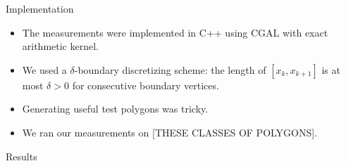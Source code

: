 \documentclass[draft]{beamer}
\begin{document}
\begin{frame}[t]{Implementation}
  \begin{itemize}
    \item The measurements were implemented in C++ using CGAL with exact
      arithmetic kernel.
    \item We used a $\delta$-boundary discretizing scheme: the length of $[x_k,
      x_{k+1}]$ is at most $\delta > 0$ for consecutive boundary vertices.
    \item Generating useful test polygons was tricky.
    \item We ran our measurements on [THESE CLASSES OF POLYGONS].
  \end{itemize}
\end{frame}

\begin{frame}[t]{Results}
  
\end{frame}
\end{document}
